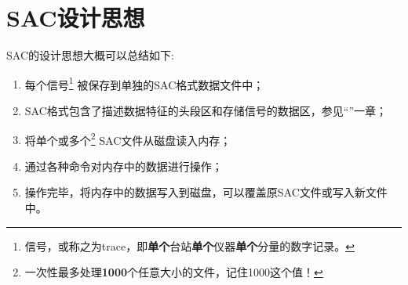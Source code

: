 \section{SAC设计思想}
SAC的设计思想大概可以总结如下:
\begin{enumerate}
    \item 每个信号\footnote{信号，或称之为trace，即\textbf{单个}台站\textbf{单个}仪器\textbf{单个}分量的数字记录。}
被保存到单独的SAC格式数据文件中；
\item SAC格式包含了描述数据特征的头段区和存储信号的数据区，参见``''一章；
\item 将单个或多个\footnote{一次性最多处理\textbf{1000}个任意大小的文件，记住1000这个值！}
    SAC文件从磁盘读入内存；
\item 通过各种命令对内存中的数据进行操作；
\item 操作完毕，将内存中的数据写入到磁盘，可以覆盖原SAC文件或写入新文件中。
\end{enumerate}
